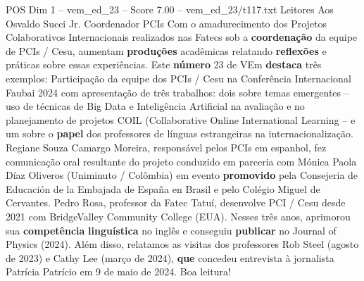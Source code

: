 \begin{textsample}{POS Dim 1 – vem\_ed\_23 – Score 7.00 – vem\_ed\_23/t117.txt}  \label{ex:f1_pos_143}
Leitores Aos Osvaldo Succi Jr.
Coordenador PCIs Com o amadurecimento dos Projetos Colaborativos Internacionais realizados nas Fatecs sob a \textbf{coordenação} da equipe de PCIs / Cesu, aumentam \textbf{produções} acadêmicas relatando \textbf{reflexões} e práticas sobre essas experiências.
Este \textbf{número} 23 de VEm \textbf{destaca} três exemplos: Participação da equipe dos PCIs / Cesu na Conferência Internacional Faubai 2024 com apresentação de três trabalhos: dois sobre temas emergentes – uso de técnicas de Big Data e Inteligência Artificial na avaliação e no planejamento de projetos COIL (Collaborative Online International Learning – e um sobre o \textbf{papel} dos professores de línguas estrangeiras na internacionalização.
Regiane Souza Camargo Moreira, responsável pelos PCIs em espanhol, fez comunicação oral resultante do projeto conduzido em parceria com Mónica Paola Díaz Oliveros (Uniminuto / Colômbia) em evento \textbf{promovido} pela Consejeria de Educación de la Embajada de España en Brasil e pelo Colégio Miguel de Cervantes.
Pedro Rosa, professor da Fatec Tatuí, desenvolve PCI / Cesu desde 2021 com BridgeValley Community College (EUA).
Nesses três anos, aprimorou sua \textbf{competência} \textbf{linguística} no inglês e conseguiu \textbf{publicar} no Journal of Physics (2024).
Além disso, relatamos as visitas dos professores Rob Steel (agosto de 2023) e Cathy Lee (março de 2024), \textbf{que} concedeu entrevista à jornalista Patrícia Patrício em 9 de maio de 2024.
Boa leitura!

\end{textsample}
